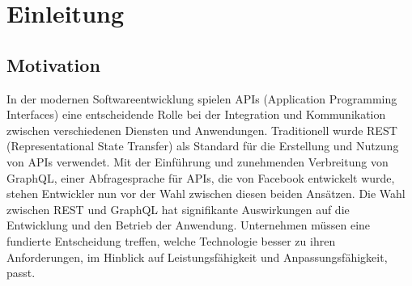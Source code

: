 \chapter{Einleitung} %
\label{sec:einleitung}

\section{Motivation} %
\label{sec:motivation}
In der modernen Softwareentwicklung spielen APIs (Application Programming Interfaces) eine entscheidende Rolle bei der Integration und Kommunikation zwischen verschiedenen Diensten und Anwendungen. Traditionell wurde REST (Representational State Transfer) als Standard für die Erstellung und Nutzung von APIs verwendet. Mit der Einführung und zunehmenden Verbreitung von GraphQL, einer Abfragesprache für APIs, die von Facebook entwickelt wurde, stehen Entwickler nun vor der Wahl zwischen diesen beiden Ansätzen. Die Wahl zwischen REST und GraphQL hat signifikante Auswirkungen auf die Entwicklung und den Betrieb der Anwendung. Unternehmen
müssen eine fundierte Entscheidung treffen, welche Technologie besser zu ihren Anforderungen, im Hinblick auf Leistungsfähigkeit und Anpassungsfähigkeit, passt.



